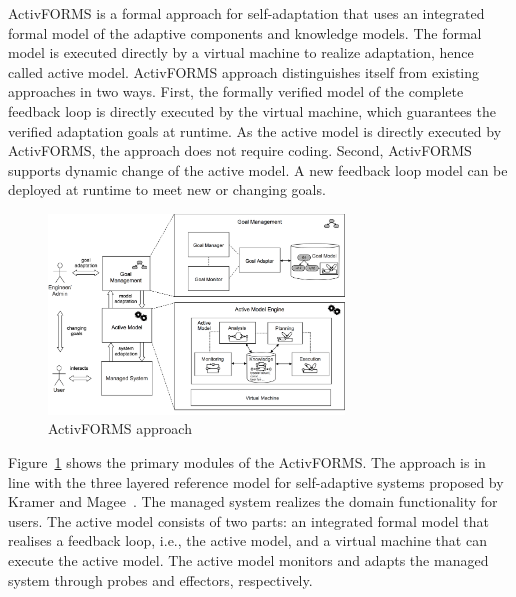 ActivFORMS is a formal approach for self-adaptation that uses an integrated formal model of the adaptive components and knowledge models. The formal model is executed directly by a virtual machine to realize adaptation, hence called active model. ActivFORMS approach distinguishes itself from existing approaches in two ways. First, the formally verified model of the complete feedback loop is directly executed by the virtual machine, which guarantees the verified adaptation goals at runtime. As the active model is directly executed by ActivFORMS, the approach does not require coding. Second, ActivFORMS supports dynamic change of the active model. A new feedback loop model can be deployed at runtime to meet new or changing goals. 

\begin{figure}[b!]
	\centering
	\includegraphics[width=0.7\textwidth]{figures/ActivFORMS-approach.png}
	\caption{ActivFORMS approach}\label{fig:activforms}
\end{figure}

Figure~\ref{fig:activforms} shows the primary modules of the ActivFORMS. The approach is in line with the three layered reference model for self-adaptive systems proposed by Kramer and Magee~\cite{Kramer2007:FOSE}. The managed system realizes the domain functionality for users. The active model consists of two parts: an integrated formal model that realises a feedback loop, i.e., the active model, and a virtual machine that can execute the active model. The active model monitors and adapts the managed system through probes and effectors, respectively. 

